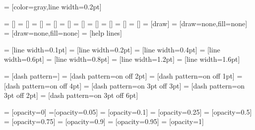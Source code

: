 \def\tikz@style@parseC#1[#2]#3=#4{%
  \pgfkeys{/tikz/#1/.default={#2}}%
  \pgfutil@in@+{#3}%
  \ifpgfutil@in@%
    \pgfkeys{/tikz/#1/.append style={#4}}%
  \else%
    \pgfkeys{/tikz/#1/.style={#4}}%
  \fi}
\def\tikz@style@parseD#1#2=#3{%
  \pgfutil@in@+{#2}%
  \ifpgfutil@in@%
    \pgfkeys{/tikz/#1/.append style={#3}}%
  \else%
    \pgfkeys{/tikz/#1/.style={#3}}%
  \fi}


%
%
%
%

=              [color=gray,line width=0.2pt]

=           []
=              []
=             []
=              []
=              []
=             []
=        []
=                []
=              []
=            []
=              [draw]
=             [draw=none,fill=none]
=               [draw=none,fill=none]
=          [help lines]

=              [line width=0.1pt]
=               [line width=0.2pt]
=                    [line width=0.4pt]
=               [line width=0.6pt]
=                   [line width=0.8pt]
=              [line width=1.2pt]
=             [line width=1.6pt]

=                   [dash pattern=]
=                  [dash pattern=on \pgflinewidth off 2pt]
=          [dash pattern=on \pgflinewidth off 1pt]
=          [dash pattern=on \pgflinewidth off 4pt]
=                  [dash pattern=on 3pt off 3pt]
=          [dash pattern=on 3pt off 2pt]
=          [dash pattern=on 3pt off 6pt]

=             [opacity=0]
=[opacity=0.05]
= [opacity=0.1]
=      [opacity=0.25]
=         [opacity=0.5]
=           [opacity=0.75]
=      [opacity=0.9]
=     [opacity=0.95]
=                  [opacity=1]

